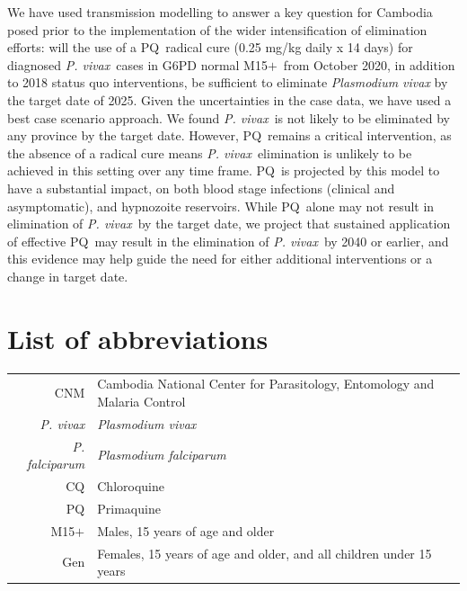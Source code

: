 \documentclass[doublespacing]{bmcart}
\newcommand{\pv}{\textit{P. vivax}}
\newcommand{\pf}{\textit{P. falciparum}}
\newcommand{\males}{M15$+$}
\newcommand{\gen}{Gen}
\newcommand{\pq}{PQ}
\begin{document}
We have used transmission modelling to answer a key question for Cambodia posed prior to the implementation of the wider intensification of elimination efforts: will the use of a \pq~radical cure (0.25 mg/kg daily x 14 days) for diagnosed \pv~cases in G6PD normal \males~from October 2020, in addition to 2018 status quo interventions, be sufficient to eliminate \textit{Plasmodium vivax} by the target date of 2025. Given the uncertainties in the case data, we have used a best case scenario approach. We found \pv~is not likely to be eliminated by any province by the target date. However, \pq~remains a critical intervention, as the absence of a radical cure means \pv~elimination is unlikely to be achieved in this setting over any time frame. \pq~is projected by this model to have a substantial impact, on both blood stage infections (clinical and asymptomatic), and hypnozoite reservoirs. While \pq~alone may not result in elimination of \pv~by the target date, we project that sustained application of effective \pq~may result in the elimination of \pv~by 2040 or earlier, and this evidence may help guide the need for either additional interventions or a change in target date.

\section*{List of abbreviations}

\begin{table}[h]
    \centering
    \begin{tabular}{r l}
        CNM & Cambodia National Center for Parasitology, Entomology and Malaria Control \\
        \pv & \textit{Plasmodium vivax} \\
        \pf & \textit{Plasmodium falciparum} \\
        CQ & Chloroquine \\
        PQ & Primaquine \\
        \males & Males, 15 years of age and older \\
        \gen & Females, 15 years of age and older, and all children under 15 years \\ 
    \end{tabular}
    \label{tab:abbreviations}
\end{table}
\end{document}
